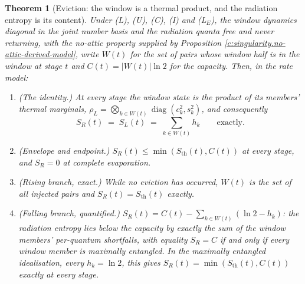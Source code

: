 \documentclass[11pt]{article}
\newtheorem{theorem}{Theorem}[section]
\theoremstyle{definition}
\theoremstyle{plain}
\newcommand{\changedmark}[2]{\marginpar{\raggedright\scriptsize\color{#1}#2}}
\providecommand{\Sth}{}\renewcommand{\Sth}{S_{\mathrm{th}}}
\begin{document}
\begin{theorem}[Eviction: the window is a thermal product, and the radiation entropy is its content]\label{c:singularity.eviction-window-thermal-product-radiation-entropy}
\changedmark{gray}{reworded}
Under (L), (U), (C), (I) and (L$_E$), the window dynamics diagonal in the joint number basis and the radiation quanta free and never returning, with the no-attic property supplied by Proposition \ref{c:singularity.no-attic-derived-model}, write $W(t)$ for the set of pairs whose window half is in the window at stage $t$ and $C(t) = |W(t)|\ln 2$ for the capacity. Then, in the rate model:
\begin{enumerate}
\item (The identity.) At every stage the window state is the product of its members' thermal marginals, $\rho_L = \bigotimes_{k \in W(t)}\operatorname{diag}(c_k^{2}, s_k^{2})$, and consequently
\[
S_R(t) \;=\; S_L(t) \;=\; \sum_{k \in W(t)} h_k \qquad \text{exactly.}
\]
\item (Envelope and endpoint.) $S_R(t) \leq \min(\Sth(t), C(t))$ at every stage, and $S_R = 0$ at complete evaporation.
\item (Rising branch, exact.) While no eviction has occurred, $W(t)$ is the set of all injected pairs and $S_R(t) = \Sth(t)$ exactly.
\item (Falling branch, quantified.) $S_R(t) = C(t) - \sum_{k \in W(t)}(\ln 2 - h_k)$: the radiation entropy lies below the capacity by exactly the sum of the window members' per-quantum shortfalls, with equality $S_R = C$ if and only if every window member is maximally entangled. In the maximally entangled idealisation, every $h_k = \ln 2$, this gives $S_R(t) = \min(\Sth(t), C(t))$ exactly at every stage.
\end{enumerate}
\end{theorem}
\end{document}
